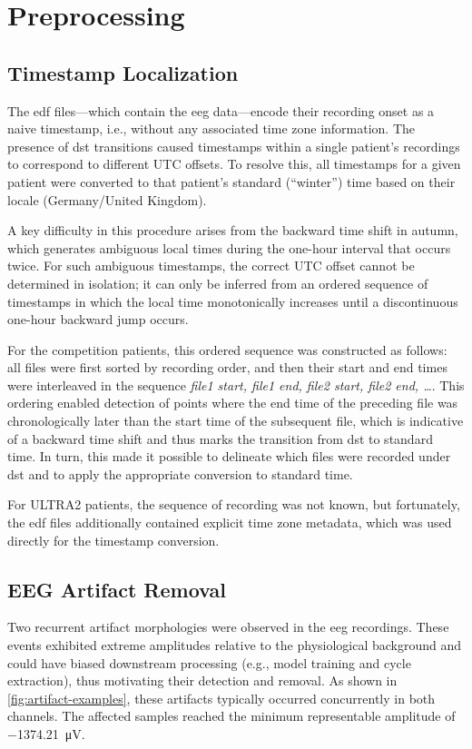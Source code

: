 \section{Preprocessing} \label{sec:preprocessing}

\subsection{Timestamp Localization} \label{subsec:timestamp-localization}
The \gls{edf} files---which contain the \gls{eeg} data---encode their recording onset as a naive timestamp, i.e., without any associated time zone information. The presence of \gls{dst} transitions caused timestamps within a single patient’s recordings to correspond to different UTC offsets.
To resolve this, all timestamps for a given patient were converted to that patient’s standard (\enquote{winter}) time based on their locale (Germany/United Kingdom).

A key difficulty in this procedure arises from the backward time shift in autumn, which generates ambiguous local times during the one-hour interval that occurs twice.
For such ambiguous timestamps, the correct UTC offset cannot be determined in isolation; it can only be inferred from an ordered sequence of timestamps in which the local time monotonically increases until a discontinuous one-hour backward jump occurs.

For the competition patients, this ordered sequence was constructed as follows: all files were first sorted by recording order, and then their start and end times were interleaved in the sequence \textit{file1 start, file1 end, file2 start, file2 end, …}.
This ordering enabled detection of points where the end time of the preceding file was chronologically later than the start time of the subsequent file, which is indicative of a backward time shift and thus marks the transition from \gls{dst} to standard time.
In turn, this made it possible to delineate which files were recorded under \gls{dst} and to apply the appropriate conversion to standard time.

For ULTRA2 patients, the sequence of recording was not known, but fortunately, the \gls{edf} files additionally contained explicit time zone metadata, which was used directly for the timestamp conversion.

\subsection{EEG Artifact Removal} \label{subsec:eeg-artifact-removal}
Two recurrent artifact morphologies were observed in the \gls{eeg} recordings.
These events exhibited extreme amplitudes relative to the physiological background and could have biased downstream processing (e.g., model training and cycle extraction), thus motivating their detection and removal.
As shown in \cref{fig:artifact-examples}, these artifacts typically occurred concurrently in both channels.
The affected samples reached the minimum representable amplitude of \SI{-1374.21}{\micro\volt}.

